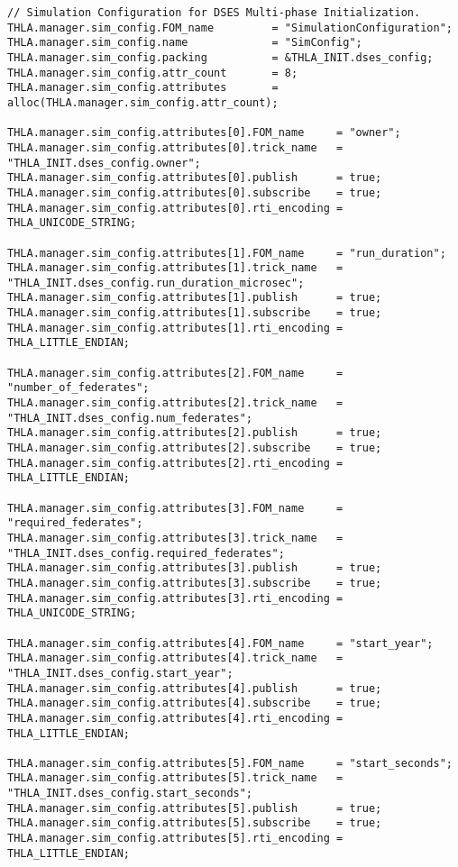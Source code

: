 \begin{lstlisting}[caption={{\tt SIM\_simplesine\_hla\_sendInt} input file},label={list:complete-sender-input}]
// Simulation Configuration for DSES Multi-phase Initialization.
THLA.manager.sim_config.FOM_name         = "SimulationConfiguration";
THLA.manager.sim_config.name             = "SimConfig";
THLA.manager.sim_config.packing          = &THLA_INIT.dses_config;
THLA.manager.sim_config.attr_count       = 8;
THLA.manager.sim_config.attributes       = alloc(THLA.manager.sim_config.attr_count);

THLA.manager.sim_config.attributes[0].FOM_name     = "owner";
THLA.manager.sim_config.attributes[0].trick_name   = "THLA_INIT.dses_config.owner";
THLA.manager.sim_config.attributes[0].publish      = true;
THLA.manager.sim_config.attributes[0].subscribe    = true;
THLA.manager.sim_config.attributes[0].rti_encoding = THLA_UNICODE_STRING;

THLA.manager.sim_config.attributes[1].FOM_name     = "run_duration";
THLA.manager.sim_config.attributes[1].trick_name   = "THLA_INIT.dses_config.run_duration_microsec";
THLA.manager.sim_config.attributes[1].publish      = true;
THLA.manager.sim_config.attributes[1].subscribe    = true;
THLA.manager.sim_config.attributes[1].rti_encoding = THLA_LITTLE_ENDIAN;

THLA.manager.sim_config.attributes[2].FOM_name     = "number_of_federates";
THLA.manager.sim_config.attributes[2].trick_name   = "THLA_INIT.dses_config.num_federates";
THLA.manager.sim_config.attributes[2].publish      = true;
THLA.manager.sim_config.attributes[2].subscribe    = true;
THLA.manager.sim_config.attributes[2].rti_encoding = THLA_LITTLE_ENDIAN;

THLA.manager.sim_config.attributes[3].FOM_name     = "required_federates";
THLA.manager.sim_config.attributes[3].trick_name   = "THLA_INIT.dses_config.required_federates";
THLA.manager.sim_config.attributes[3].publish      = true;
THLA.manager.sim_config.attributes[3].subscribe    = true;
THLA.manager.sim_config.attributes[3].rti_encoding = THLA_UNICODE_STRING;

THLA.manager.sim_config.attributes[4].FOM_name     = "start_year";
THLA.manager.sim_config.attributes[4].trick_name   = "THLA_INIT.dses_config.start_year";
THLA.manager.sim_config.attributes[4].publish      = true;
THLA.manager.sim_config.attributes[4].subscribe    = true;
THLA.manager.sim_config.attributes[4].rti_encoding = THLA_LITTLE_ENDIAN;

THLA.manager.sim_config.attributes[5].FOM_name     = "start_seconds";
THLA.manager.sim_config.attributes[5].trick_name   = "THLA_INIT.dses_config.start_seconds";
THLA.manager.sim_config.attributes[5].publish      = true;
THLA.manager.sim_config.attributes[5].subscribe    = true;
THLA.manager.sim_config.attributes[5].rti_encoding = THLA_LITTLE_ENDIAN;


\end{lstlisting}
